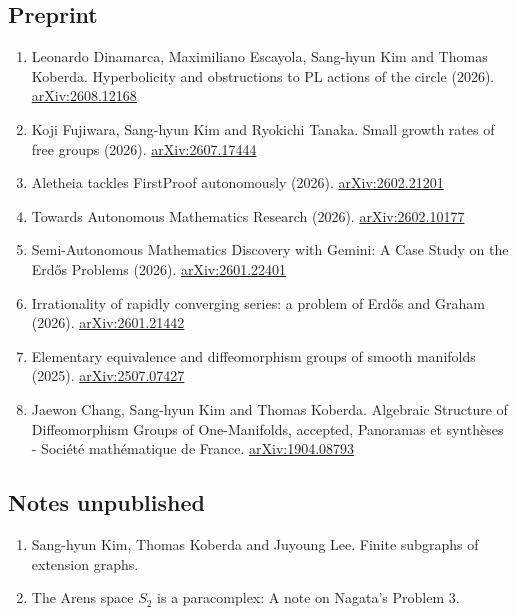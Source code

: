 \documentclass[11pt,a4paper]{article}
\begin{document}
\subsection*{Preprint}
\begin{enumerate}[leftmargin=1.5em, label=\arabic*.]
\item Leonardo Dinamarca, Maximiliano Escayola, Sang-hyun Kim and Thomas Koberda. Hyperbolicity and obstructions to PL actions of the circle (2026). \href{https://arxiv.org/abs/2608.12168}{arXiv:2608.12168}
\item Koji Fujiwara, Sang-hyun Kim and Ryokichi Tanaka. Small growth rates of free groups (2026). \href{https://arxiv.org/abs/2607.17444}{arXiv:2607.17444}
\item Aletheia tackles FirstProof autonomously (2026). \href{https://arxiv.org/abs/2602.21201}{arXiv:2602.21201}
\item Towards Autonomous Mathematics Research (2026). \href{https://arxiv.org/abs/2602.10177}{arXiv:2602.10177}
\item Semi-Autonomous Mathematics Discovery with Gemini: A Case Study on the Erd\H{o}s Problems (2026). \href{https://arxiv.org/abs/2601.22401}{arXiv:2601.22401}
\item Irrationality of rapidly converging series: a problem of Erd\H{o}s and Graham (2026). \href{https://arxiv.org/abs/2601.21442}{arXiv:2601.21442}
\item Elementary equivalence and diffeomorphism groups of smooth manifolds (2025). \hfil{}\hfilneg\href{https://arxiv.org/abs/2507.07427}{arXiv:2507.07427}
\item Jaewon Chang, Sang-hyun Kim and Thomas Koberda. Algebraic Structure of Diffeomorphism Groups of One-Manifolds, accepted, Panoramas et synth\`eses - Soci\'et\'e math\'ematique de France. \href{https://arxiv.org/abs/1904.08793}{arXiv:1904.08793}
\end{enumerate}

\subsection*{Notes unpublished}
\begin{enumerate}[leftmargin=1.5em, label=\arabic*.]
\item Sang-hyun Kim, Thomas Koberda and Juyoung Lee. Finite subgraphs of extension graphs.
\item The Arens space $S_2$ is a paracomplex: A note on Nagata's Problem 3.
\end{enumerate}
\end{document}
